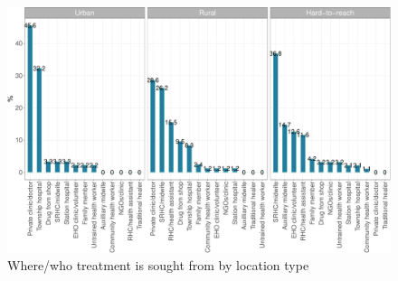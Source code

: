 \documentclass[12pt,a4paper]{article}
\begin{document}
\begin{figure}[H]

{\centering \includegraphics{kayahReport_files/figure-latex/fever6plot-1} 

}

\caption{Where/who treatment is sought from by location type}\label{fig:fever6plot}
\end{figure}
\end{document}
